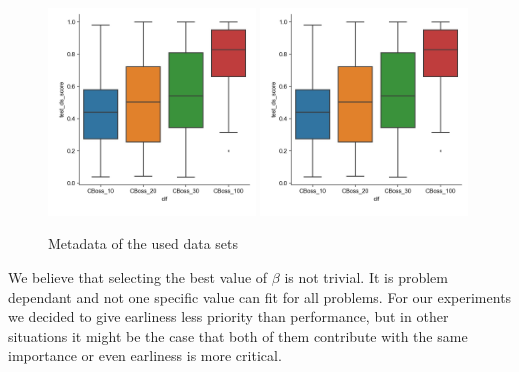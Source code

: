 \begin{figure}[!htbp]
  \captionsetup{justification=raggedright}
  \includegraphics[width=0.49\textwidth,keepaspectratio]{boxplot_accuracy_CBoss.jpg}
  \includegraphics[width=0.49\textwidth,keepaspectratio]{boxplot_accuracy_CBoss.jpg}
  \caption{Metadata of the used data sets}
  \label{fig:FBeta1}
\end{figure}

We believe that selecting the best value of $\beta$ is not trivial.
It is problem dependant and not one specific value can fit for all problems.
For our experiments we decided to give earliness less priority than performance,
but in other situations it might be the case that both of them contribute with the same importance or even earliness is more critical.